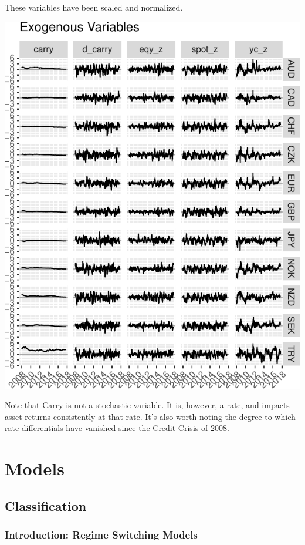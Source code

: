 \documentclass[]{article}
\begin{document}
These variables have been scaled and normalized.

\includegraphics{Econometric_FX_Forecasting_files/figure-latex/graph_exogs-1.pdf}

Note that Carry is not a stochastic variable. It is, however, a rate,
and impacts asset returns consistently at that rate. It's also worth
noting the degree to which rate differentials have vanished since the
Credit Crisis of 2008.

\section{Models}\label{models}

\subsection{Classification}\label{classification}

\subsubsection{Introduction: Regime Switching
Models}\label{introduction-regime-switching-models}
\end{document}
